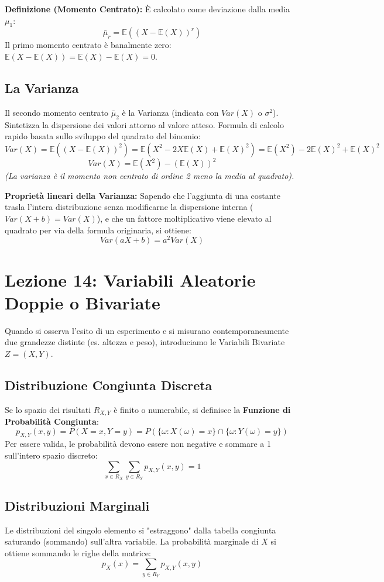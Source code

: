 \documentclass[12pt, a4paper]{article}
\begin{document}
\textbf{Definizione (Momento Centrato):} È calcolato come deviazione dalla media $\mu_1$:
$$ \bar{\mu}_r = \mathbb{E}((X - \mathbb{E}(X))^r) $$
Il primo momento centrato è banalmente zero: $\mathbb{E}(X - \mathbb{E}(X)) = \mathbb{E}(X) - \mathbb{E}(X) = 0$.

\subsection{La Varianza}
Il secondo momento centrato $\bar{\mu}_2$ è la Varianza (indicata con $Var(X)$ o $\sigma^2$). Sintetizza la dispersione dei valori attorno al valore atteso.
Formula di calcolo rapido basata sullo sviluppo del quadrato del binomio:
$$ Var(X) = \mathbb{E}((X - \mathbb{E}(X))^2) = \mathbb{E}(X^2 - 2X\mathbb{E}(X) + \mathbb{E}(X)^2) = \mathbb{E}(X^2) - 2\mathbb{E}(X)^2 + \mathbb{E}(X)^2 $$
$$ Var(X) = \mathbb{E}(X^2) - (\mathbb{E}(X))^2 $$
\textit{(La varianza è il momento non centrato di ordine 2 meno la media al quadrato).}

\textbf{Proprietà lineari della Varianza:}
Sapendo che l'aggiunta di una costante trasla l'intera distribuzione senza modificarne la dispersione interna ($Var(X+b) = Var(X)$), e che un fattore moltiplicativo viene elevato al quadrato per via della formula originaria, si ottiene:
$$ Var(aX + b) = a^2 Var(X) $$


\section{Lezione 14: Variabili Aleatorie Doppie o Bivariate}

Quando si osserva l'esito di un esperimento e si misurano contemporaneamente due grandezze distinte (es. altezza e peso), introduciamo le Variabili Bivariate $Z = (X, Y)$. 

\subsection{Distribuzione Congiunta Discreta}
Se lo spazio dei risultati $R_{X,Y}$ è finito o numerabile, si definisce la \textbf{Funzione di Probabilità Congiunta}:
$$ p_{X,Y}(x,y) = P(X=x, Y=y) = P(\{\omega : X(\omega)=x\} \cap \{\omega : Y(\omega)=y\}) $$
Per essere valida, le probabilità devono essere non negative e sommare a 1 sull'intero spazio discreto:
$$ \sum_{x \in R_X} \sum_{y \in R_Y} p_{X,Y}(x,y) = 1 $$

\subsection{Distribuzioni Marginali}
Le distribuzioni del singolo elemento si "estraggono" dalla tabella congiunta saturando (sommando) sull'altra variabile.
La probabilità marginale di $X$ si ottiene sommando le righe della matrice:
$$ p_X(x) = \sum_{y \in R_Y} p_{X,Y}(x,y) $$
\end{document}
